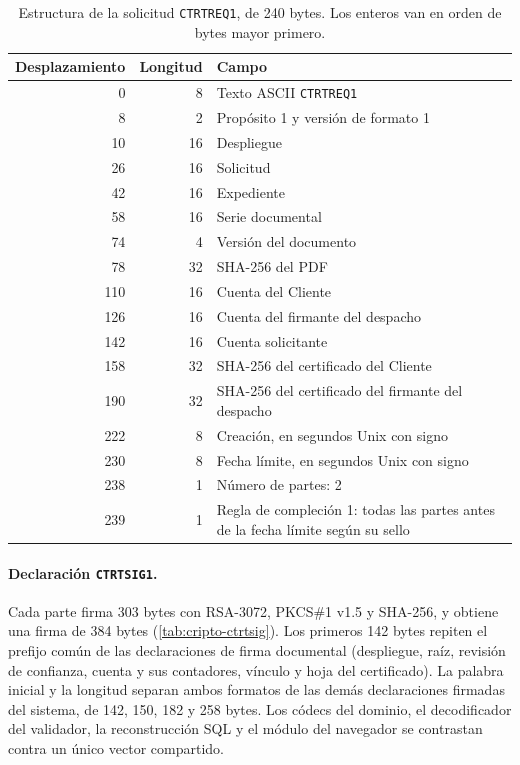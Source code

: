 \begin{table}[!htbp]
  \centering
  \caption{Estructura de la solicitud \texttt{CTRTREQ1}, de 240 bytes. Los enteros van en orden de bytes mayor primero.}
  \label{tab:cripto-ctrtreq}
  
  \begin{tabularx}{\linewidth}{@{}r r X@{}}
    \toprule
    \textbf{Desplazamiento} & \textbf{Longitud} & \textbf{Campo} \\
    \midrule
    0 & 8 & Texto ASCII \texttt{CTRTREQ1} \\
    8 & 2 & Propósito 1 y versión de formato 1 \\
    10 & 16 & Despliegue \\
    26 & 16 & Solicitud \\
    42 & 16 & Expediente \\
    58 & 16 & Serie documental \\
    74 & 4 & Versión del documento \\
    78 & 32 & SHA-256 del PDF \\
    110 & 16 & Cuenta del Cliente \\
    126 & 16 & Cuenta del firmante del despacho \\
    142 & 16 & Cuenta solicitante \\
    158 & 32 & SHA-256 del certificado del Cliente \\
    190 & 32 & SHA-256 del certificado del firmante del despacho \\
    222 & 8 & Creación, en segundos Unix con signo \\
    230 & 8 & Fecha límite, en segundos Unix con signo \\
    238 & 1 & Número de partes: 2 \\
    239 & 1 & Regla de compleción 1: todas las partes antes de la fecha límite según su sello \\
    \bottomrule
  \end{tabularx}
\end{table}

\paragraph{Declaración \texttt{CTRTSIG1}.} Cada parte firma 303 bytes con
RSA-3072, PKCS\#1 v1.5 y SHA-256, y obtiene una firma de 384 bytes
(\cref{tab:cripto-ctrtsig}). Los primeros 142 bytes repiten el prefijo común de
las declaraciones de firma documental (despliegue, raíz, revisión de
confianza, cuenta y sus contadores, vínculo y hoja del certificado). La
palabra inicial y la longitud separan ambos formatos de las demás
declaraciones firmadas del sistema, de 142, 150, 182 y 258 bytes. Los
códecs del dominio, el decodificador del validador, la reconstrucción SQL y el
módulo del navegador se contrastan contra un único vector compartido.

